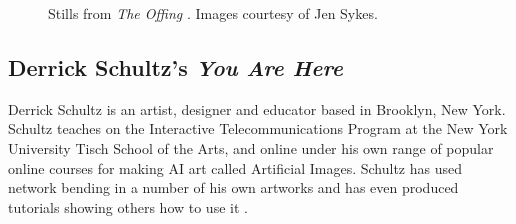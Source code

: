 \begin{figure}[!htbp]
    \caption[Stills from \textit{The Offing}]{Stills from \textit{The Offing} \citep{sykes2022offing}. Images courtesy of Jen Sykes.}
    \label{fig:c7:offing}
 \end{figure}

\subsection{Derrick Schultz's \textit{You Are Here}}
\label{c7:subsubsec:schultz}

Derrick Schultz is an artist, designer and educator based in Brooklyn, New York. Schultz teaches on the Interactive Telecommunications Program at the New York University Tisch School of the Arts, and online under his own range of popular online courses for making AI art called Artificial Images. 
Schultz has used network bending in a number of his own artworks and has even produced tutorials showing others how to use it \citep{schultz2020netbending}. 

